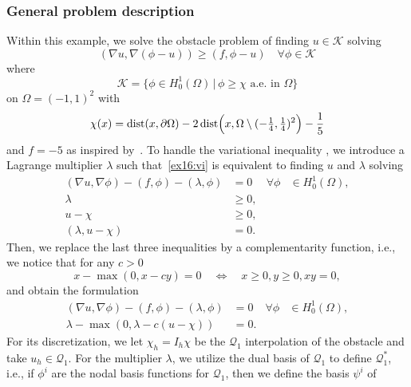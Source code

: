 \subsubsection{General problem description}
Within this example, we solve the obstacle problem
of finding $u \in \mathcal K$ solving 
\begin{equation}\label{ex16:vi}
  (\nabla u, \nabla (\phi-u)) \ge (f,\phi-u) \quad \forall \phi \in
  \mathcal K
\end{equation}
where
\[
  \mathcal K = \{\phi \in H^1_0(\Omega)\,|\, \phi \ge \chi \text{ a.e. in }\Omega\}
\]
on $\Omega = (-1,1)^2$ with
\[
 \chi(x) = \operatorname{dist}(x,\partial \Omega) - 2
 \operatorname{dist}\Bigl(x,\Omega \setminus (-\tfrac{1}{4},\tfrac{1}{4})^2\Bigr) -\frac{1}{5}
\]
and $f = -5$ as inspired
by~\cite[Example~7.5]{NochettoSiebertVeeser:2003}.
To handle the variational inequality ,
we introduce a Lagrange multiplier $\lambda$ such that~\eqref{ex16:vi}
is equivalent to finding $u$ and $\lambda$ solving 
\begin{equation}\label{ex16:lagrange}
  \begin{aligned}
    (\nabla u, \nabla \phi) - (f,\phi) - (\lambda,\phi) &= 0 & \forall
    \phi &\in H^1_0(\Omega),\\
    \lambda & \ge 0,\\
    u-\chi & \ge 0,\\
    (\lambda,u-\chi) &=0.
  \end{aligned}
\end{equation}
Then, we replace the last three inequalities by a complementarity
function, i.e., we notice that for any $c > 0$ 
\[
  x-\max(0,x-cy) = 0 \quad\Leftrightarrow \quad x \ge 0, y \ge 0, xy
  = 0,
\]
and obtain the formulation
\begin{equation}\label{ex16:complementarity}
  \begin{aligned}
    (\nabla u, \nabla \phi) - (f,\phi) - (\lambda,\phi) &= 0 & \forall
    \phi &\in H^1_0(\Omega),\\
    \lambda - \max(0,\lambda-c(u-\chi)) &= 0.
  \end{aligned}
\end{equation}
For its discretization, we let $\chi_h = I_h \chi$ be the $\mathcal
Q_1$ interpolation of the obstacle and take $u_h \in \mathcal Q_1$.
For the multiplier $\lambda$, we utilize the dual basis of $\mathcal
Q_1$ to define $\mathcal Q_1^*$, i.e., if $\phi^i$ are the nodal basis
functions for $\mathcal Q_1$, then we define the basis $\psi^i$ of
